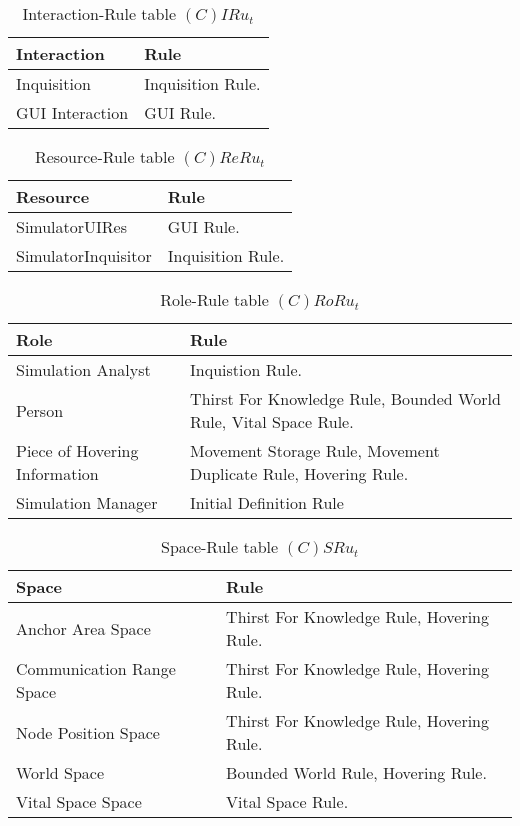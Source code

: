 \begin{table}[H]
	\centering
	\begin{tabular}{|p{4cm}|p{8cm}|}
			\hline
			\textbf{Interaction} & \textbf{Rule} \\
			\hline
			Inquisition & Inquisition Rule. \\
			\hline
			GUI Interaction & GUI Rule. \\
			\hline
		\end{tabular}
	\caption{Interaction-Rule table $(C)IRu_t$}
	\label{tab:cirut}
\end{table}

\begin{table}[H]
	\centering
	\begin{tabular}{|p{4cm}|p{8cm}|}
			\hline
			\textbf{Resource} & \textbf{Rule} \\
			\hline
			SimulatorUIRes & GUI Rule. \\
			\hline
			SimulatorInquisitor & Inquisition Rule. \\
			\hline
		\end{tabular}
	\caption{Resource-Rule table $(C)ReRu_t$}
	\label{tab:crerut}
\end{table}

\begin{table}[H]
	\centering
	\begin{tabular}{|p{4cm}|p{8cm}|}
			\hline
			\textbf{Role} & \textbf{Rule} \\
			\hline
			Simulation Analyst & Inquistion Rule. \\
			\hline
			Person & Thirst For Knowledge Rule, Bounded World Rule, Vital Space Rule. \\
			\hline
			Piece of Hovering Information & Movement Storage Rule, Movement Duplicate
			Rule, Hovering Rule. \\
			\hline
			Simulation Manager & Initial Definition Rule\\
			\hline
		\end{tabular}
	\caption{Role-Rule table $(C)RoRu_t$}
	\label{tab:crorut}
\end{table}

\begin{table}[H]
	\centering
	\begin{tabular}{|p{4cm}|p{8cm}|}
			\hline
			\textbf{Space} & \textbf{Rule} \\
			\hline
			Anchor Area Space & Thirst For Knowledge Rule, Hovering Rule. \\
			\hline
			Communication Range Space & Thirst For Knowledge Rule, Hovering Rule. \\
			\hline
			Node Position Space & Thirst For Knowledge Rule, Hovering Rule. \\
			\hline
			World Space & Bounded World Rule, Hovering Rule. \\
			\hline
			Vital Space Space & Vital Space Rule. \\
			\hline
		\end{tabular}
	\caption{Space-Rule table $(C)SRu_t$}
	\label{tab:cot}
\end{table}


